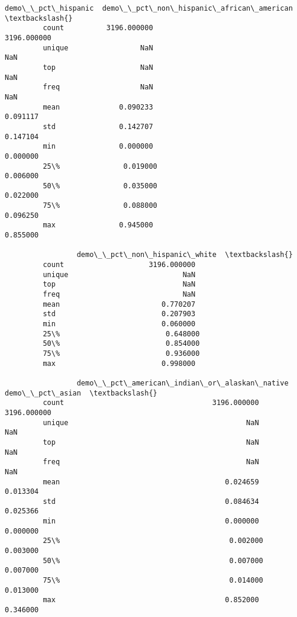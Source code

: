 \documentclass[11pt]{article}
\begin{document}
\begin{Verbatim}[commandchars=\\\{\}]
                 demo\_\_pct\_hispanic  demo\_\_pct\_non\_hispanic\_african\_american  \textbackslash{}
         count          3196.000000                              3196.000000   
         unique                 NaN                                      NaN   
         top                    NaN                                      NaN   
         freq                   NaN                                      NaN   
         mean              0.090233                                 0.091117   
         std               0.142707                                 0.147104   
         min               0.000000                                 0.000000   
         25\%               0.019000                                 0.006000   
         50\%               0.035000                                 0.022000   
         75\%               0.088000                                 0.096250   
         max               0.945000                                 0.855000   
         
                 demo\_\_pct\_non\_hispanic\_white  \textbackslash{}
         count                    3196.000000   
         unique                           NaN   
         top                              NaN   
         freq                             NaN   
         mean                        0.770207   
         std                         0.207903   
         min                         0.060000   
         25\%                         0.648000   
         50\%                         0.854000   
         75\%                         0.936000   
         max                         0.998000   
         
                 demo\_\_pct\_american\_indian\_or\_alaskan\_native  demo\_\_pct\_asian  \textbackslash{}
         count                                   3196.000000      3196.000000   
         unique                                          NaN              NaN   
         top                                             NaN              NaN   
         freq                                            NaN              NaN   
         mean                                       0.024659         0.013304   
         std                                        0.084634         0.025366   
         min                                        0.000000         0.000000   
         25\%                                        0.002000         0.003000   
         50\%                                        0.007000         0.007000   
         75\%                                        0.014000         0.013000   
         max                                        0.852000         0.346000   
         

\end{Verbatim}
\end{document}
